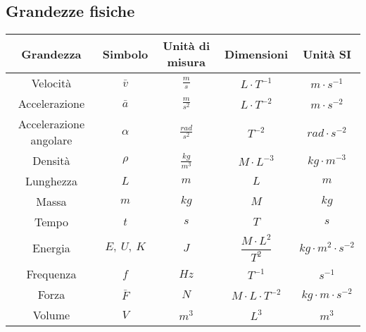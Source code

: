 \documentclass[../../main.tex]{subfiles}
\begin{document}
\subsection{Grandezze fisiche}
\begin{table}[h!]
    \centering
    \begin{tabular}{|c|c|c|c|c|}
        \hline
        \textbf{Grandezza}     & \textbf{Simbolo} & \textbf{Unità di misura} & \textbf{Dimensioni}        & \textbf{Unità SI}           \\
        \hline
        Velocità               & $\bar v$         & $\frac{m}{s}$            & $L \cdot T^{-1}$           & $m \cdot s^{-1}$            \\
        Accelerazione          & $\bar a$         & $\frac{m}{s^2}$          & $L \cdot T^{-2}$           & $m \cdot s^{-2}$            \\
        Accelerazione angolare & $\alpha$         & $\frac{rad}{s^2}$        & $T^{-2}$                   & $rad \cdot s^{-2}$          \\
        Densità                & $\rho$           & $\frac{kg}{m^3}$         & $M \cdot L^{-3}$           & $kg \cdot m^{-3}$           \\
        Lunghezza              & $L$              & $m$                      & $L$                        & $m$                         \\
        Massa                  & $m$              & $kg$                     & $M$                        & $kg$                        \\
        Tempo                  & $t$              & $s$                      & $T$                        & $s$                         \\
        Energia                & $E, \ U, \ K$    & $J$                      & $\dfrac{M \cdot L^2}{T^2}$ & $kg \cdot m^2 \cdot s^{-2}$ \\
        Frequenza              & $f$              & $Hz$                     & $T^{-1}$                   & $s^{-1}$                    \\
        Forza                  & $\bar{F}$        & $N$                      & $M \cdot L \cdot T^{-2}$   & $kg \cdot m \cdot s^{-2}$   \\
        Volume                 & $V$              & $m^3$                    & $L^3$                      & $m^3$                       \\
        \hline
    \end{tabular}
\end{table}
\end{document}
